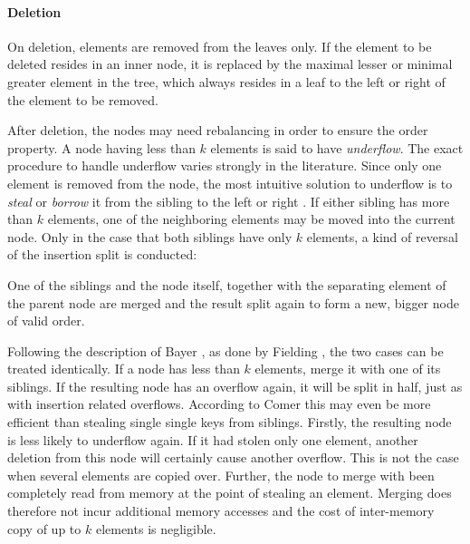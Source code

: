 \paragraph{Deletion}\label{par:intro-del}
On deletion, elements are removed from the leaves only.
If the element to be deleted resides in an inner node,
it is replaced by the maximal lesser or minimal greater
element in the tree, which always resides in a leaf
to the left or right of the element to be removed.

After deletion, the nodes may need rebalancing in order
to ensure the order property.
A node having less than $k$ elements is said to have \textit{underflow}.
The exact procedure to handle underflow varies strongly in the literature.
Since only one element is removed from the node,
the most intuitive solution to underflow is to \textit{steal} or \textit{borrow} it
from the sibling to the left or right \parencite{DBLP:books/daglib/0023376}.
If either sibling has more than $k$ elements,
one of the neighboring elements may be moved into the current node.
Only in the case that both siblings have only $k$ elements,
a kind of reversal of the insertion split is conducted:

One of the siblings and the node itself, together with the separating
element of the parent node are merged and the result split again to form
a new, bigger node of valid order.

Following the description of Bayer \parencite{DBLP:journals/acta/BayerM72},
as done by Fielding \parencite{Fielding80},
the two cases can be treated identically.
If a node has less than $k$ elements,
merge it with one of its siblings.
If the resulting node has an overflow again,
it will be split in half, just as with insertion related overflows.
According to Comer \parencite{DBLP:journals/csur/Comer79} this may even be
more efficient than stealing single single keys from siblings.
Firstly, the resulting node is less likely to underflow again.
If it had stolen only one element, another deletion from this node
will certainly cause another overflow.
This is not the case when several elements are copied over.
Further, the node to merge with been completely read from memory at the point
of stealing an element.
Merging does therefore not incur additional memory accesses and
the cost of inter-memory copy of up to $k$ elements is negligible.


